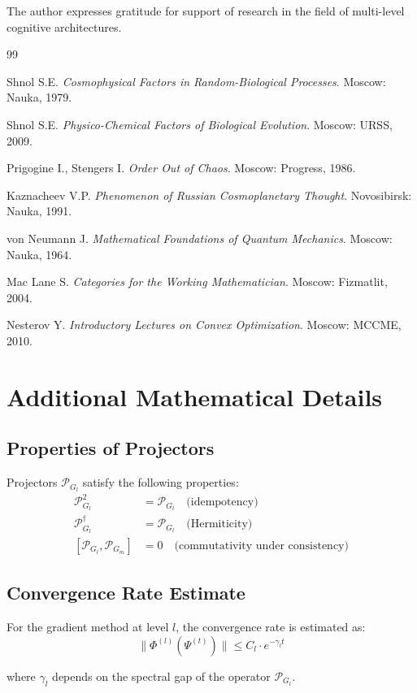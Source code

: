 \documentclass[12pt,a4paper]{article}
\newcommand{\calP}{\mathcal{P}}
\newcommand{\PhiFunc}{\Phi}
\begin{document}
The author expresses gratitude for support of research in the field of multi-level cognitive architectures.

\begin{thebibliography}{99}

Shnol S.E. \textit{Cosmophysical Factors in Random-Biological Processes}. Moscow: Nauka, 1979.

Shnol S.E. \textit{Physico-Chemical Factors of Biological Evolution}. Moscow: URSS, 2009.

Prigogine I., Stengers I. \textit{Order Out of Chaos}. Moscow: Progress, 1986.

Kaznacheev V.P. \textit{Phenomenon of Russian Cosmoplanetary Thought}. Novosibirsk: Nauka, 1991.

von Neumann J. \textit{Mathematical Foundations of Quantum Mechanics}. Moscow: Nauka, 1964.

Mac Lane S. \textit{Categories for the Working Mathematician}. Moscow: Fizmatlit, 2004.

Nesterov Y. \textit{Introductory Lectures on Convex Optimization}. Moscow: MCCME, 2010.

\end{thebibliography}

\appendix

\section{Additional Mathematical Details}

\subsection{Properties of Projectors}

Projectors $\calP_{G_l}$ satisfy the following properties:
\begin{align}
\calP_{G_l}^2 &= \calP_{G_l} \quad \text{(idempotency)} \\
\calP_{G_l}^\dagger &= \calP_{G_l} \quad \text{(Hermiticity)} \\
[\calP_{G_l}, \calP_{G_m}] &= 0 \quad \text{(commutativity under consistency)}
\end{align}

\subsection{Convergence Rate Estimate}

For the gradient method at level $l$, the convergence rate is estimated as:
\begin{equation}
\|\PhiFunc^{(l)}(\Psi^{(t)})\| \leq C_l \cdot e^{-\gamma_l t}
\end{equation}

where $\gamma_l$ depends on the spectral gap of the operator $\calP_{G_l}$.
\end{document}
